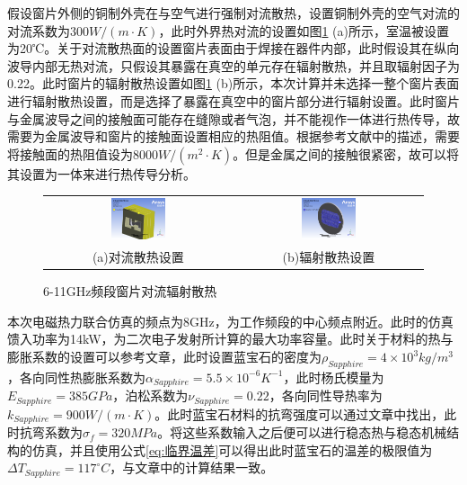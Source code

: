 \documentclass[master]{thesis-uestc}
\begin{document}
假设窗片外侧的铜制外壳在与空气进行强制对流散热，设置铜制外壳的空气对流的对流系数为\(300 W/ (m \cdot K)\)，此时外界热对流的设置如图\ref{fig:X频段窗片对流辐射散热} (a)所示，室温被设置为20℃。关于对流散热面的设置窗片表面由于焊接在器件内部，此时假设其在纵向波导内部无热对流，只假设其暴露在真空的单元存在辐射散热，并且取辐射因子为0.22。此时窗片的辐射散热设置如图\ref{fig:X频段窗片对流辐射散热} (b)所示，本次计算并未选择一整个窗片表面进行辐射散热设置，而是选择了暴露在真空中的窗片部分进行辐射设置。此时窗片与金属波导之间的接触面可能存在缝隙或者气泡，并不能视作一体进行热传导，故需要为金属波导和窗片的接触面设置相应的热阻值。根据参考文献\cite{jiang_2022_design}中的描述，需要将接触面的热阻值设为8000\(W / (m^2 \cdot K)\)。但是金属之间的接触很紧密，故可以将其设置为一体来进行热传导分析。
\begin{figure}[!htb]
    \small
    \centering
    \begin{tabular}{@{\ }c@{\ }c}
        \includegraphics[width=0.3\textwidth]{pic/chapter3/窗片对流系数.png} & 
        \hspace{5pt}
        \includegraphics[width=0.3\textwidth]{pic/chapter3/辐射单元选择.png}     \\
        \mbox{\small (a)对流散热设置}                                                                               & 
        \mbox{\small (b)辐射散热设置}                                                                                  \\
    \end{tabular}
    \caption{6-11GHz频段窗片对流辐射散热}
    \label{fig:X频段窗片对流辐射散热}
\end{figure}

本次电磁热力联合仿真的频点为8GHz，为工作频段的中心频点附近。此时的仿真馈入功率为14kW，为二次电子发射所计算的最大功率容量。此时关于材料的热与膨胀系数的设置可以参考文章\cite{thumm_stateart_2020}，此时设置蓝宝石的密度为\( \rho_{Sapphire}= 4 \times 10^3 kg/ m^3\)，各向同性热膨胀系数为\(\alpha_{Sapphire} = 5.5 \times 10 ^{-6}K^{-1}\)，此时杨氏模量为\( E_{Sapphire}= 385 GPa \)，泊松系数为\( \nu_{Sapphire}= 0.22 \)，各向同性导热率为\(k_{Sapphire} =900 W/(m \cdot K)\)。此时蓝宝石材料的抗弯强度可以通过文章\cite{hanyong_diff_2011}中找出，此时抗弯系数为\(\sigma_{f} = 320MPa\)。将这些系数输入之后便可以进行稳态热与稳态机械结构的仿真，并且使用公式\ref{eq:临界温差}可以得出此时蓝宝石的温差的极限值为\(\Delta T_{Sapphire} = 117 ^\circ C\)，与文章中\cite{han_sapphire_2011}的计算结果一致。
\end{document}
